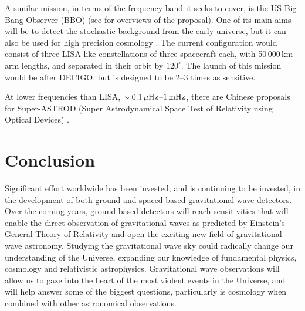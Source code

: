 \documentclass{article}
\begin{document}
A similar mission, in terms of the frequency band it seeks to cover, is the US
Big Bang Observer (BBO) (see \cite{Crowder:2005, Cutler:2009, Harry:2006} for
overviews of the proposal). One of its main aims will be to detect the
stochastic background from the early universe, but it can also be used for high
precision cosmology \cite{Cutler:2009}. The current configuration would consist
of three LISA-like constellations of three spacecraft each, with 50\,000\,km arm
lengths, and separated in their orbit by $120^{\circ}$. The launch of this
mission would be after DECIGO, but is designed to be 2--3 times as sensitive.

At lower frequencies than LISA, $\sim0.1\,\mu{\rm Hz}$--$1\,{\rm mHz}$, there
are Chinese proposals for Super-ASTROD (Super Astrodynamical Space Test of
Relativity using Optical Devices) \cite{Ni:2009}.


\newpage

\section{Conclusion}
\label{section:conclusion}

Significant effort worldwide has been invested, and is continuing to be
invested, in the development of both ground and spaced based gravitational wave
detectors. Over the coming years, ground-based detectors will reach
sensitivities that will enable the direct observation of gravitational waves as
predicted by Einstein's General Theory of Relativity and open the exciting new
field of gravitational wave astronomy. Studying the gravitational wave
sky could radically change our understanding of the Universe, expanding our
knowledge of fundamental physics, cosmology and relativistic astrophysics.
Gravitational wave observations will allow us to gaze into the heart of the most
violent events in the Universe, and will help answer some of the biggest
questions, particularly is cosmology when combined with other astronomical
observations.

\end{document}
